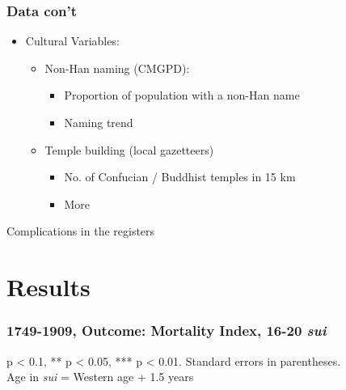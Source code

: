 \begin{frame}[label=data2]
\frametitle{Data con't}
\begin{itemize} %
\item Cultural Variables:
\begin{itemize} %
\item Non-Han naming (CMGPD): 
\begin{itemize} %
\item Proportion of population with a non-Han name
\item Naming trend \hyperlink{culture}{}
\end{itemize} %

\item Temple building (local gazetteers)
\begin{itemize}
\item No. of Confucian / Buddhist temples in 15 km
\item More \hyperlink{templesdata}{}
\end{itemize}
\end{itemize} %
\end{itemize} %

{\tiny Complications in the registers \hyperlink{ageofdeath}{}}

\end{frame}



\section{Results}


\begin{frame}[label = results16to20]
\frametitle{1749-1909, Outcome: Mortality Index, 16-20 \emph{sui} \hyperlink{datadefs}{} \hyperlink{sumstats16to20}{}}
\begin{table}\centering
{}
\end{table}
\parbox{\linewidth}{\tiny * p < 0.1, ** p < 0.05, *** p < 0.01. Standard errors in parentheses.\\
Age in \emph{sui} = Western age + 1.5 years
}
\end{frame}


